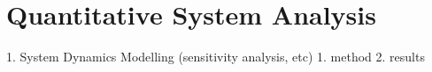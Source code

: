 \section{Quantitative System Analysis}

1. System Dynamics Modelling (sensitivity analysis, etc)
   1. method
   2. results



\hfill
